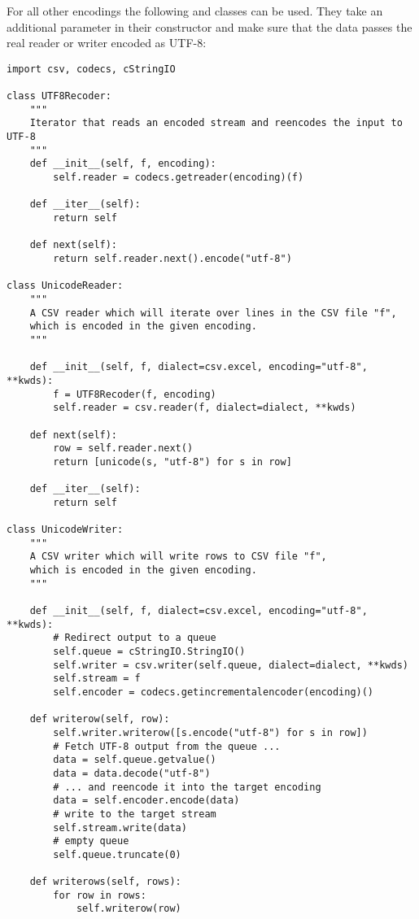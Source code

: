 For all other encodings the following  and
 classes can be used. They take an additional
 parameter in their constructor and make sure that the data
passes the real reader or writer encoded as UTF-8:

\begin{verbatim}
import csv, codecs, cStringIO

class UTF8Recoder:
    """
    Iterator that reads an encoded stream and reencodes the input to UTF-8
    """
    def __init__(self, f, encoding):
        self.reader = codecs.getreader(encoding)(f)

    def __iter__(self):
        return self

    def next(self):
        return self.reader.next().encode("utf-8")

class UnicodeReader:
    """
    A CSV reader which will iterate over lines in the CSV file "f",
    which is encoded in the given encoding.
    """

    def __init__(self, f, dialect=csv.excel, encoding="utf-8", **kwds):
        f = UTF8Recoder(f, encoding)
        self.reader = csv.reader(f, dialect=dialect, **kwds)

    def next(self):
        row = self.reader.next()
        return [unicode(s, "utf-8") for s in row]

    def __iter__(self):
        return self

class UnicodeWriter:
    """
    A CSV writer which will write rows to CSV file "f",
    which is encoded in the given encoding.
    """

    def __init__(self, f, dialect=csv.excel, encoding="utf-8", **kwds):
        # Redirect output to a queue
        self.queue = cStringIO.StringIO()
        self.writer = csv.writer(self.queue, dialect=dialect, **kwds)
        self.stream = f
        self.encoder = codecs.getincrementalencoder(encoding)()

    def writerow(self, row):
        self.writer.writerow([s.encode("utf-8") for s in row])
        # Fetch UTF-8 output from the queue ...
        data = self.queue.getvalue()
        data = data.decode("utf-8")
        # ... and reencode it into the target encoding
        data = self.encoder.encode(data)
        # write to the target stream
        self.stream.write(data)
        # empty queue
        self.queue.truncate(0)

    def writerows(self, rows):
        for row in rows:
            self.writerow(row)
\end{verbatim}
